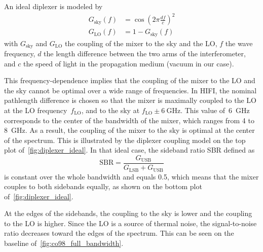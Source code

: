 An ideal diplexer is modeled by
\begin{align}
    G_\text{sky}(f)
    &=
    \cos
    \left(
        2 \pi
        \frac{df}{c}
    \right)^2
    \\
    G_\text{LO}(f)
    &=
    1 - G_\text{sky}(f)
    \label{eq:diplexer_coupling_model}
\end{align}
with $G_\text{sky}$ and $G_\text{LO}$ the coupling of the mixer to the sky and the LO,
$f$ the wave frequency,
$d$ the length difference between the two arms of the interferometer,
and $c$ the speed of light in the propagation medium (vacuum in our case).

This frequency-dependence implies that the coupling of the mixer to the LO and the sky cannot be optimal over a wide range of frequencies.
In HIFI, the nominal pathlength difference is chosen so that the mixer is maximally coupled to the LO at the LO frequency~$f_\text{LO}$,
and to the sky at $f_\text{LO} \pm \SI{6}{\giga\hertz}$.
This value of~\SI{6}{\giga\hertz} corresponds to the center of the bandwidth of the mixer, which ranges from \num{4} to \SI{8}{\giga\hertz}.
As a result, the coupling of the mixer to the sky is optimal at the center of the spectrum.
This is illustrated by the diplexer coupling model on the top plot of~\cref{fig:diplexer_ideal}.
In that ideal case, the sideband ratio SBR defined as
\begin{equation}
    \text{SBR} =
    \frac{
        G_\text{USB}
    }{
        G_\text{LSB} + G_\text{USB}
    }
\end{equation}
is constant over the whole bandwidth and equals \num{0.5}, which means that the mixer couples to both sidebands equally, as shown on the bottom plot of~\cref{fig:diplexer_ideal}.

At the edges of the sidebands, the coupling to the sky is lower and the coupling to the LO is higher.
Since the LO is a source of thermal noise, the signal-to-noise ratio decreases toward the edges of the spectrum.
This can be seen on the baseline of~\cref{fig:co98_full_bandwidth}.

